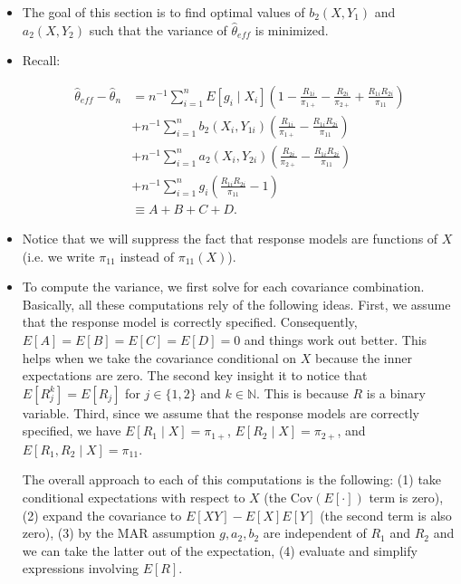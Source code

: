 \documentclass[12pt]{article}
\newcommand{\Cov}{{\text{Cov}}}
\begin{document}
\begin{itemize}
  \item The goal of this section is to find optimal values of $b_2(X, Y_1)$ and
    $a_2(X, Y_2)$ such that the variance of $\hat \theta_{eff}$ is minimized.

  \item Recall:

    \begin{align*}
      \hat \theta_{eff} - \hat \theta_n 
      &= n^{-1} \sum_{i = 1}^n E[g_i \mid X_i] \left(1 - \frac{R_{1i}}{\pi_{1+}}
      - \frac{R_{2i}}{\pi_{2+}} + \frac{R_{1i}R_{2i}}{\pi_{11}}\right) \\
      &+ n^{-1} \sum_{i = 1}^n b_2(X_i, Y_{1i}) \left(\frac{R_{1i}}{\pi_{1+}} -
      \frac{R_{1i}R_{2i}}{\pi_{11}}\right)\\
      &+ n^{-1} \sum_{i = 1}^n a_2(X_i, Y_{2i}) \left(\frac{R_{2i}}{\pi_{2+}} -
      \frac{R_{1i}R_{2i}}{\pi_{11}}\right)\\
      &+ n^{-1} \sum_{i = 1}^n g_i \left(\frac{R_{1i}R_{2i}}{\pi_{11}} -
      1\right) \\
      &\equiv A + B + C + D.
    \end{align*}

  \item Notice that we will suppress the fact that response models are functions
    of $X$ (i.e. we write $\pi_{11}$ instead of $\pi_{11}(X)$).
  
  \item To compute the variance, we first solve for each covariance combination.
    Basically, all these computations rely of the following ideas. First, we
    assume that the response model is correctly specified. Consequently,
    $E[A] = E[B] = E[C] = E[D] = 0$ and things work out better. This helps when
    we take the covariance conditional on $X$ because the inner expectations are
    zero. The second key insight it to notice that $E[R_{j}^k] = E[R_j]$ for $j
    \in \{1, 2\}$ and $k \in \mathbb{N}$. This is because $R$ is a binary
    variable. Third, since we assume that the response models are correctly
    specified, we have $E[R_1 \mid X] = \pi_{1+}$, $E[R_2 \mid X] = \pi_{2+}$,
    and $E[R_1, R_2 \mid X] = \pi_{11}$.

    The overall approach to each of this computations is the following:
    (1) take conditional expectations with respect to $X$ (the $\Cov(E[\cdot])$
    term is zero), (2) expand the covariance to $E[XY] - E[X]E[Y]$ (the second
    term is also zero), (3) by the MAR assumption $g, a_2, b_2$ are independent
    of $R_1$ and $R_2$ and we can take the latter out of the expectation, (4)
    evaluate and simplify expressions involving $E[R]$.
  

\end{itemize}
\end{document}
